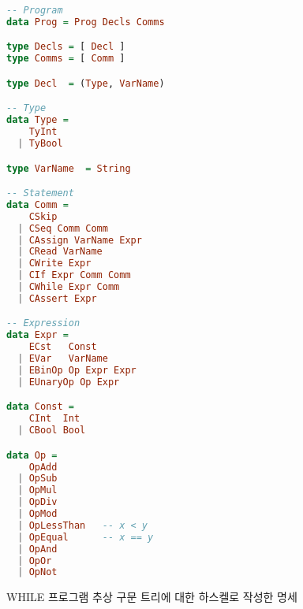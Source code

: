 \documentclass[a4paper]{book}
\begin{document}
\begin{figure}[h]
{\footnotesize
\begin{center}
\begin{minipage}[h]{.6\textwidth}
\begin{lstlisting}[language=Haskell]
-- Program
data Prog = Prog Decls Comms

type Decls = [ Decl ]
type Comms = [ Comm ]

type Decl  = (Type, VarName)

-- Type
data Type =
    TyInt
  | TyBool

type VarName  = String

-- Statement
data Comm =
    CSkip
  | CSeq Comm Comm
  | CAssign VarName Expr
  | CRead VarName
  | CWrite Expr
  | CIf Expr Comm Comm
  | CWhile Expr Comm
  | CAssert Expr

-- Expression
data Expr =
    ECst   Const
  | EVar   VarName
  | EBinOp Op Expr Expr
  | EUnaryOp Op Expr

data Const =
    CInt  Int
  | CBool Bool

data Op =
    OpAdd
  | OpSub
  | OpMul
  | OpDiv
  | OpMod
  | OpLessThan   -- x < y
  | OpEqual      -- x == y
  | OpAnd
  | OpOr
  | OpNot
\end{lstlisting}
\end{minipage}
\end{center}
}
\caption{WHILE 프로그램 추상 구문 트리에 대한 하스켈로 작성한 명세}
\end{figure}




\end{document}
